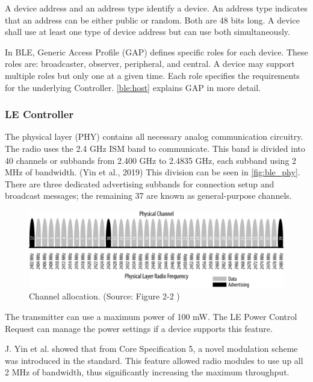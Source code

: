 A device address and an address type identify a device.
An address type indicates that an address can be either public or random.
Both are 48 bits long.
A device shall use at least one type of device address but can use
both simultaneously.

In BLE, Generic Access Profile (GAP) defines specific roles for each device.
These roles are: broadcaster, observer, peripheral, and central.
A device may support multiple roles but only one at a given time.
Each role specifies the requirements for the underlying Controller.
\autoref{ble:host} explains GAP in more detail.

\subsubsection{LE Controller}
\label{ble:controller}

The physical layer (PHY) contains all necessary analog communication circuitry.
The radio uses the 2.4 GHz ISM band to communicate.
This band is divided into 40 channels or subbands from 2.400 GHz to 2.4835 GHz,
each subband using 2 MHz of bandwidth. (Yin et al., 2019)
This division can be seen in \autoref{fig:ble_phy}.
There are three dedicated advertising subbands for connection setup and
broadcast messages; the remaining 37 are known as general-purpose channels.

\begin{figure}[!ht]
    \centering
    \includegraphics[width=150mm, keepaspectratio]{figures/ble_phy.png}
    \caption{Channel allocation. (Source: Figure 2-2 \cite{Townsend14})}
    \label{fig:ble_phy}
\end{figure}

The transmitter can use a maximum power of 100 mW.
The LE Power Control Request can manage the power settings if a device supports this feature.

J. Yin et al. \cite{Yin:19} showed that from Core Specification 5, a novel
modulation scheme was introduced in the standard.
This feature allowed radio modules to use up all 2 MHz of bandwidth,
thus significantly increasing the maximum throughput.

